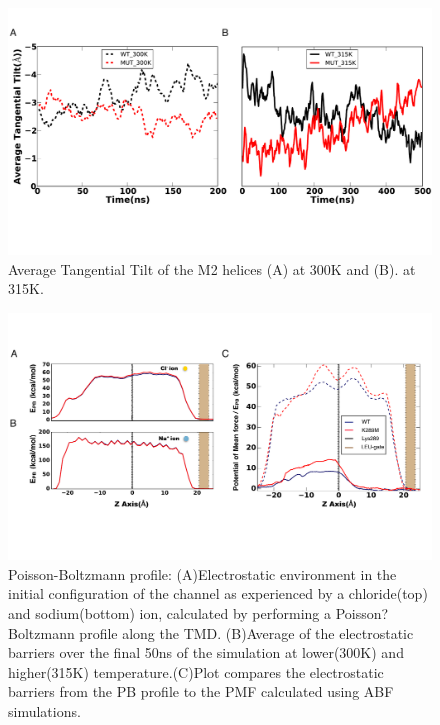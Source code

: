 \documentclass[12pt,onecolumn]{biophys}
\begin{document}
\newcommand{\WT}{Wild-type\xspace}
\newcommand{\MT}{Mutant\xspace}
\newcommand{\RMSD}{RMSD(symm)\xspace}
\newcommand{\WTs}{Wild-types\xspace}
\newcommand{\MTs}{Mutants\xspace}
\newcommand{\RMSDs}{RMSDs(symm)}
\renewcommand{\thefigure}{S\arabic{figure}}
\setcounter{figure}{0}




\begin{figure}
\begin{center}
\includegraphics[width = 1\textwidth]{figures/Sup-tangential_tilt.pdf}
\end{center}
\caption{Average Tangential Tilt of the M2 helices (A) at 300K and (B). at 315K.}
\label{fig:avgTilt}
\end{figure}




\begin{figure}
\begin{center}
\includegraphics[width = 1\textwidth]{figures/sup2_APBS}
\end{center}
\caption{Poisson-Boltzmann profile: (A)Electrostatic environment in the initial configuration of the channel as experienced by a chloride(top) and sodium(bottom) ion, calculated by performing a Poisson?Boltzmann profile along the TMD. (B)Average of the electrostatic barriers over the final 50ns of the simulation at lower(300K) and higher(315K) temperature.(C)Plot compares the electrostatic barriers from the PB profile to the PMF calculated using ABF simulations.}
\label{fig:APBS_2}
\end{figure}
\end{document}
